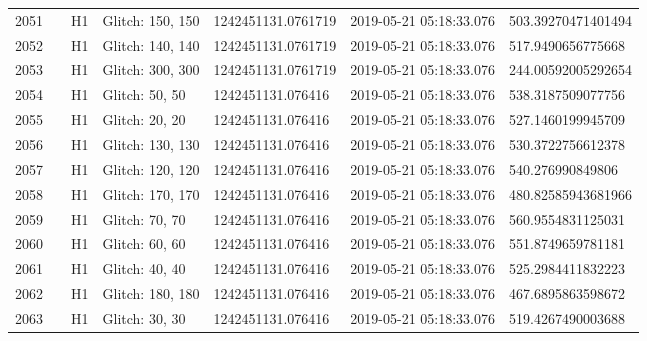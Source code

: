 \begin{longtable}{lllllll}
2051 &                                                    &       H1 &  Glitch: 150, 150 &  1242451131.0761719 &  2019-05-21 05:18:33.076 &  503.39270471401494 \\
2052 &                                                    &       H1 &  Glitch: 140, 140 &  1242451131.0761719 &  2019-05-21 05:18:33.076 &   517.9490656775668 \\
2053 &                                                    &       H1 &  Glitch: 300, 300 &  1242451131.0761719 &  2019-05-21 05:18:33.076 &  244.00592005292654 \\
2054 &                                                    &       H1 &    Glitch: 50, 50 &   1242451131.076416 &  2019-05-21 05:18:33.076 &   538.3187509077756 \\
2055 &                                                    &       H1 &    Glitch: 20, 20 &   1242451131.076416 &  2019-05-21 05:18:33.076 &   527.1460199945709 \\
2056 &                                                    &       H1 &  Glitch: 130, 130 &   1242451131.076416 &  2019-05-21 05:18:33.076 &   530.3722756612378 \\
2057 &                                                    &       H1 &  Glitch: 120, 120 &   1242451131.076416 &  2019-05-21 05:18:33.076 &    540.276990849806 \\
2058 &                                                    &       H1 &  Glitch: 170, 170 &   1242451131.076416 &  2019-05-21 05:18:33.076 &  480.82585943681966 \\
2059 &                                                    &       H1 &    Glitch: 70, 70 &   1242451131.076416 &  2019-05-21 05:18:33.076 &   560.9554831125031 \\
2060 &                                                    &       H1 &    Glitch: 60, 60 &   1242451131.076416 &  2019-05-21 05:18:33.076 &   551.8749659781181 \\
2061 &                                                    &       H1 &    Glitch: 40, 40 &   1242451131.076416 &  2019-05-21 05:18:33.076 &   525.2984411832223 \\
2062 &                                                    &       H1 &  Glitch: 180, 180 &   1242451131.076416 &  2019-05-21 05:18:33.076 &   467.6895863598672 \\
2063 &                                                    &       H1 &    Glitch: 30, 30 &   1242451131.076416 &  2019-05-21 05:18:33.076 &   519.4267490003688 \\

\end{longtable}
